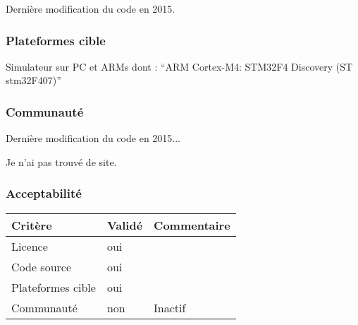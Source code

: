 Dernière modification du code en 2015.

\subsubsection{Plateformes cible}
Simulateur sur PC et ARMs dont :
\enquote{ARM Cortex-M4: STM32F4 Discovery (ST stm32F407)}

\subsubsection{Communauté}
Dernière modification du code en 2015...

Je n'ai pas trouvé de site.

\subsubsection{Acceptabilité}
\begin{tabular}{lll}
\toprule
	Critère				&	Validé		&	Commentaire	\\
\midrule
	Licence				&	oui			&		\\
	Code source			&	oui			&		\\
	Plateformes cible	&	oui			&		\\
	Communauté			&	non			&	Inactif	\\
\bottomrule
\end{tabular}

